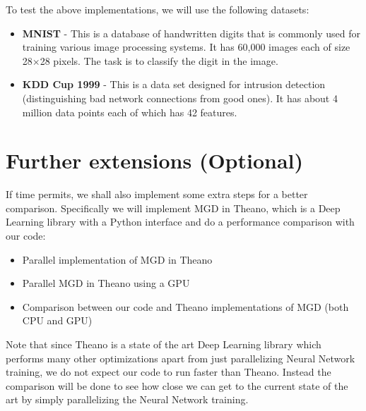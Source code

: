 \documentclass[11pt,letterpaper]{article}
\begin{document}
To test the above implementations, we will use the following datasets: 
\begin{itemize}
    \item \textbf{MNIST} - This is a database of handwritten digits that is commonly used for training various image processing systems. It has 60,000 images each of size 28$\times$28 pixels. The task is to classify the digit in the image. 
    \item \textbf{KDD Cup 1999} - This is a data set designed for intrusion detection (distinguishing bad network connections from good ones). It has about 4 million data points each of which has 42 features.  
\end{itemize}

\section{Further extensions (Optional)}

If time permits, we shall also implement some extra steps for a better comparison. Specifically we will implement MGD in Theano, which is a Deep Learning library with a Python interface and do a performance comparison with our code:
\begin{itemize}
\item Parallel implementation of MGD in Theano
\item Parallel MGD in Theano using a GPU
\item Comparison between our code and Theano implementations of MGD (both CPU and GPU)
\end{itemize}
Note that since Theano is a state of the art Deep Learning library which performs many other optimizations apart from just parallelizing Neural Network training, we do not expect our code to run faster than Theano. Instead the comparison will be done to see how close we can get to the current state of the art by simply parallelizing the Neural Network training.
\end{document}
